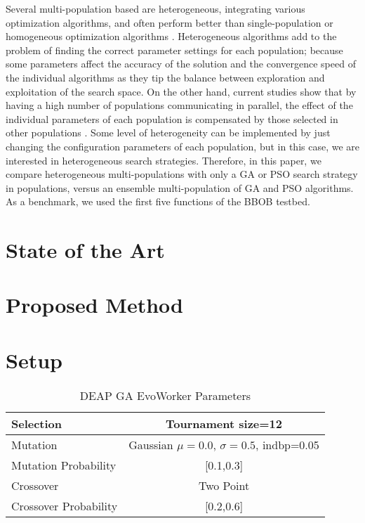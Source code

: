 Several multi-population based are heterogeneous,
integrating various optimization algorithms, and often perform better than
single-population or homogeneous optimization algorithms
\cite{wu2016differential,nseef2016adaptive}. Heterogeneous algorithms add to
the problem of finding the correct parameter settings for each population;
because some parameters affect the accuracy of the solution and the convergence
speed of the individual algorithms as they tip the balance between exploration
and exploitation of the search space. On the other hand, current studies show
that by having a high number of populations communicating in parallel, the
effect of the individual parameters of each population is compensated by those
selected in other populations \cite{li2016multi,tanabe2013evaluation}. Some
level of heterogeneity can be implemented by just changing the configuration
parameters of each population, but in this case, we are interested in
heterogeneous search strategies. Therefore, in this paper, we compare
heterogeneous multi-populations with only a GA or PSO search strategy in
populations, versus an ensemble multi-population of GA and PSO algorithms. As a
benchmark, we used the first five functions of the BBOB testbed.

\section{State of the Art}

\section{Proposed Method}

\section{Setup}
\begin{table}
    \small
    \caption{ DEAP GA EvoWorker Parameters }
    \label{tab:GAparams} 
    \centering
    \small
    \begin{tabular}{|l|c|}
      \hline
      Selection & Tournament size=12                            \\ \hline
      Mutation & Gaussian $\mu=0.0$, $\sigma=0.5$, indbp=0.05   \\ \hline
      Mutation Probability & [0.1,0.3]                          \\ \hline
      Crossover & Two Point                                     \\ \hline
      Crossover Probability  & [0.2,0.6]                          \\ \hline
    \end{tabular}
  \end{table}
  

